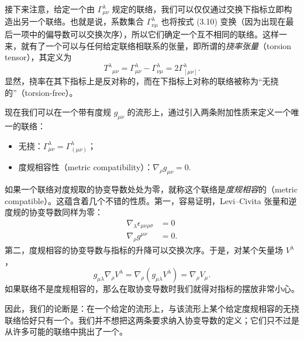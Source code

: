 接下来注意，给定一个由 $\Gamma^\lambda_{\mu\nu}$ 规定的联络，我们可以仅仅通过交换下指标立即构造出另一个联络。也就是说，系数集合 $\Gamma^\lambda_{\nu\mu}$ 也将按式 (3.10) 变换（因为出现在最后一项中的偏导数可以交换次序），所以它们确定一个互不相同的联络。这样一来，就有了一个可以与任何给定联络相联系的张量，即所谓的\emph{挠率张量}（torsion tensor），其定义为
\begin{equation*}
T^\lambda{}_{\mu\nu} = \Gamma^\lambda_{\mu\nu} - \Gamma^\lambda_{\nu\mu} = 2\Gamma^\lambda_{[\mu\nu]}.
\tag{3.22}
\end{equation*}
显然，挠率在其下指标上是反对称的，而在下指标上对称的联络被称为“无挠的”（torsion-free）。

现在我们可以在一个带有度规 $g_{\mu\nu}$ 的流形上，通过引入两条附加性质来定义一个唯一的联络：
\begin{itemize}
\item 无挠：$\Gamma^\lambda_{\mu\nu} = \Gamma^\lambda_{(\mu\nu)}$；
\item 度规相容性（metric compatibility）：$\nabla_\rho g_{\mu\nu} = 0$.
\end{itemize}

如果一个联络对度规取的协变导数处处为零，就称这个联络是\emph{度规相容}的（metric compatible）。这蕴含着几个不错的性质。第一，容易证明，Levi–Civita 张量和逆度规的协变导数同样为零：
\begin{align*}
\nabla_\lambda\epsilon_{\mu\nu\rho\sigma} &= 0\\
\nabla_\rho g^{\mu\nu} &= 0.
\tag{3.23}
\end{align*}
第二，度规相容的协变导数与指标的升降可以交换次序。于是，对某个矢量场 $V^\lambda$，
\begin{equation*}
g_{\mu\lambda}\nabla_\rho V^\lambda = \nabla_\rho(g_{\mu\lambda}V^\lambda) = \nabla_\rho V_\mu.
\tag{3.24}
\end{equation*}
如果联络不是度规相容的，那么在取协变导数时我们就得对指标的摆放非常小心。

因此，我们的论断是：在一个给定的流形上，与该流形上某个给定度规相容的无挠联络恰好只有一个。我们并不想把这两条要求纳入协变导数的定义；它们只不过是从许多可能的联络中挑出了一个。

